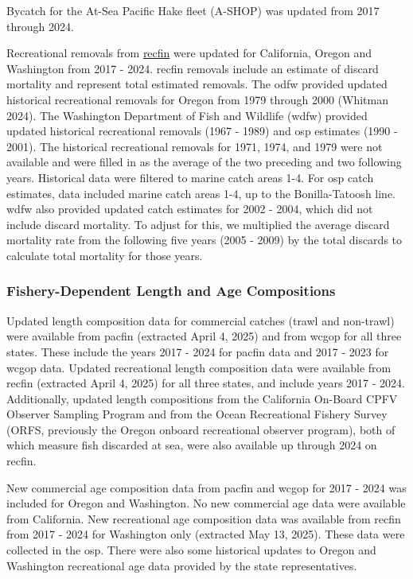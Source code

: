 \documentclass[
]{scrartcl}
\begin{document}
Bycatch for the At-Sea Pacific Hake fleet (A-SHOP) was updated from 2017
through 2024.

Recreational removals from \href{www.recfin.org}{\gls{recfin}} were
updated for California, Oregon and Washington from 2017 - 2024.
\gls{recfin} removals include an estimate of discard mortality and
represent total estimated removals. The \gls{odfw} provided updated
historical recreational removals for Oregon from 1979 through 2000
(Whitman 2024). The Washington Department of Fish and Wildlife
(\gls{wdfw}) provided updated historical recreational removals (1967 -
1989) and \gls{osp} estimates (1990 - 2001). The historical recreational
removals for 1971, 1974, and 1979 were not available and were filled in
as the average of the two preceding and two following years. Historical
data were filtered to marine catch areas 1-4. For \gls{osp} catch
estimates, data included marine catch areas 1-4, up to the
Bonilla-Tatoosh line. \gls{wdfw} also provided updated catch estimates
for 2002 - 2004, which did not include discard mortality. To adjust for
this, we multiplied the average discard mortality rate from the
following five years (2005 - 2009) by the total discards to calculate
total mortality for those years.

\subsubsection{Fishery-Dependent Length and Age
Compositions}\label{sec-fd_comps}

Updated length composition data for commercial catches (trawl and
non-trawl) were available from \gls{pacfin} (extracted April 4, 2025)
and from \gls{wcgop} for all three states. These include the years 2017
- 2024 for \gls{pacfin} data and 2017 - 2023 for \gls{wcgop} data.
Updated recreational length composition data were available from
\gls{recfin} (extracted April 4, 2025) for all three states, and include
years 2017 - 2024. Additionally, updated length compositions from the
California On-Board CPFV Observer Sampling Program and from the Ocean
Recreational Fishery Survey (ORFS, previously the Oregon onboard
recreational observer program), both of which measure fish discarded at
sea, were also available up through 2024 on \gls{recfin}.

New commercial age composition data from \gls{pacfin} and \gls{wcgop}
for 2017 - 2024 was included for Oregon and Washington. No new
commercial age data were available from California. New recreational age
composition data was available from \gls{recfin} from 2017 - 2024 for
Washington only (extracted May 13, 2025). These data were collected in
the \gls{osp}. There were also some historical updates to Oregon and
Washington recreational age data provided by the state representatives.
\end{document}
